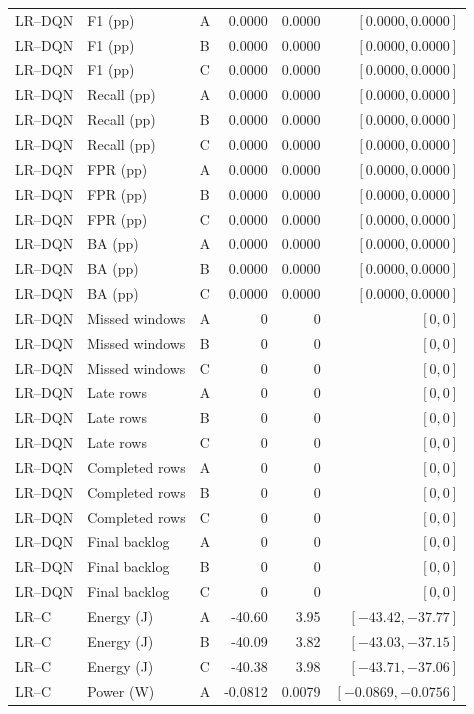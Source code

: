 \begin{longtable}{lllrrr}
LR--DQN & F1 (pp) & A & 0.0000 & 0.0000 & $[0.0000,0.0000]$\\
LR--DQN & F1 (pp) & B & 0.0000 & 0.0000 & $[0.0000,0.0000]$\\
LR--DQN & F1 (pp) & C & 0.0000 & 0.0000 & $[0.0000,0.0000]$\\
LR--DQN & Recall (pp) & A & 0.0000 & 0.0000 & $[0.0000,0.0000]$\\
LR--DQN & Recall (pp) & B & 0.0000 & 0.0000 & $[0.0000,0.0000]$\\
LR--DQN & Recall (pp) & C & 0.0000 & 0.0000 & $[0.0000,0.0000]$\\
LR--DQN & FPR (pp) & A & 0.0000 & 0.0000 & $[0.0000,0.0000]$\\
LR--DQN & FPR (pp) & B & 0.0000 & 0.0000 & $[0.0000,0.0000]$\\
LR--DQN & FPR (pp) & C & 0.0000 & 0.0000 & $[0.0000,0.0000]$\\
LR--DQN & BA (pp) & A & 0.0000 & 0.0000 & $[0.0000,0.0000]$\\
LR--DQN & BA (pp) & B & 0.0000 & 0.0000 & $[0.0000,0.0000]$\\
LR--DQN & BA (pp) & C & 0.0000 & 0.0000 & $[0.0000,0.0000]$\\
LR--DQN & Missed windows & A & 0 & 0 & $[0,0]$\\
LR--DQN & Missed windows & B & 0 & 0 & $[0,0]$\\
LR--DQN & Missed windows & C & 0 & 0 & $[0,0]$\\
LR--DQN & Late rows & A & 0 & 0 & $[0,0]$\\
LR--DQN & Late rows & B & 0 & 0 & $[0,0]$\\
LR--DQN & Late rows & C & 0 & 0 & $[0,0]$\\
LR--DQN & Completed rows & A & 0 & 0 & $[0,0]$\\
LR--DQN & Completed rows & B & 0 & 0 & $[0,0]$\\
LR--DQN & Completed rows & C & 0 & 0 & $[0,0]$\\
LR--DQN & Final backlog & A & 0 & 0 & $[0,0]$\\
LR--DQN & Final backlog & B & 0 & 0 & $[0,0]$\\
LR--DQN & Final backlog & C & 0 & 0 & $[0,0]$\\
LR--C & Energy (J) & A & -40.60 & 3.95 & $[-43.42,-37.77]$\\
LR--C & Energy (J) & B & -40.09 & 3.82 & $[-43.03,-37.15]$\\
LR--C & Energy (J) & C & -40.38 & 3.98 & $[-43.71,-37.06]$\\
LR--C & Power (W) & A & -0.0812 & 0.0079 & $[-0.0869,-0.0756]$\\

\end{longtable}
